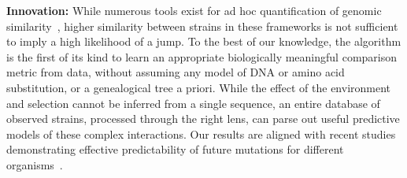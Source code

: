 \documentclass[onecolumn, compsoc,12pt]{IEEEtran}
\begin{document}
\textbf{Innovation:} %
While numerous tools exist for ad hoc quantification of genomic similarity~\cite{posada1998modeltest,goldberger2005genomic,huelsenbeck1997phylogeny,neher2014predicting,VanderMeer2010,Smith2009}, higher similarity between strains in  these frameworks is not sufficient to imply a high likelihood of a jump. To the best of our knowledge, the \enet algorithm is  the first of its kind to learn an appropriate biologically meaningful comparison metric from data, without assuming any model of DNA or amino acid substitution, or a genealogical tree a priori. While the effect of the environment and selection cannot be inferred from a single sequence, an entire database of observed strains, processed through the right lens, can parse out useful predictive models of these complex interactions. Our results are  aligned with recent studies demonstrating effective  predictability of  future mutations  for different organisms~\cite{mollentze2021identifying,maher2021predicting}.



\clearpage
{}


 



\clearpage

\end{document}
